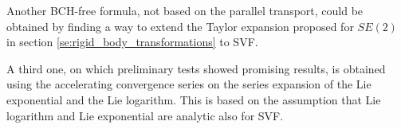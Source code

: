 Another BCH-free formula, not based on the parallel transport, could be obtained by finding a way to extend the Taylor expansion proposed for $SE(2)$ in section \ref{se:rigid_body_transformations} to SVF.

A third one, on which  preliminary tests showed promising results, is obtained using the accelerating convergence series \cite{cohen2000convergence} on the series expansion of the Lie exponential and the Lie logarithm. This is based on the assumption that Lie logarithm and Lie exponential are analytic also for SVF.

